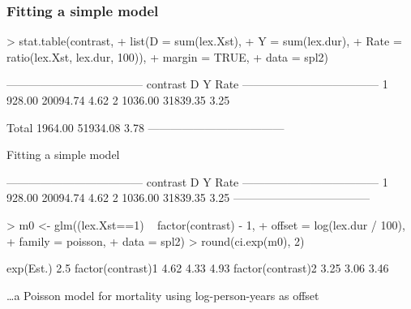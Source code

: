 \begin{frame}[fragile]
  \frametitle{Fitting a simple model}
\begin{Schunk}
\begin{Sinput}
> stat.table(contrast,
+            list(D = sum(lex.Xst),
+                 Y = sum(lex.dur),
+              Rate = ratio(lex.Xst, lex.dur, 100)),
+            margin = TRUE,
+              data = spl2)
\end{Sinput}
\begin{Soutput}
 ------------------------------------ 
 contrast         D        Y    Rate  
 ------------------------------------ 
 1           928.00 20094.74    4.62  
 2          1036.00 31839.35    3.25  
                                      
 Total      1964.00 51934.08    3.78  
 ------------------------------------ 
\end{Soutput}
\end{Schunk}
\end{frame}

\begin{frame}[fragile]{Fitting a simple model}
\begin{Schunk}
\begin{Soutput}
 ------------------------------------ 
 contrast         D        Y    Rate  
 ------------------------------------ 
 1           928.00 20094.74    4.62  
 2          1036.00 31839.35    3.25  
 ------------------------------------ 
\end{Soutput}
\end{Schunk}
\begin{Schunk}
\begin{Sinput}
> m0 <- glm((lex.Xst==1) ~ factor(contrast) - 1,
+           offset = log(lex.dur / 100),
+           family = poisson,
+             data = spl2)
> round(ci.exp(m0), 2)
\end{Sinput}
\begin{Soutput}
                  exp(Est.) 2.5%
factor(contrast)1      4.62 4.33  4.93
factor(contrast)2      3.25 3.06  3.46
\end{Soutput}
\end{Schunk}
\small
\ldots a Poisson model for mortality using log-person-years as offset
\end{frame}

